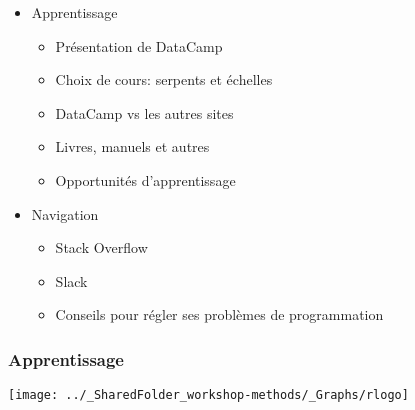\documentclass{beamer}
\begin{document}
    \begin{frame}
    
        \begin{itemize}
        
        \item{Apprentissage}
        
          \begin{itemize}
            \item Présentation de DataCamp 
            \item Choix de cours: serpents et échelles
            \item DataCamp vs les autres sites
            \item Livres, manuels et autres 
            \item Opportunités d'apprentissage
          \end{itemize}
        
         \item{Navigation}
         
          \begin{itemize}
            \item{Stack Overflow}
            \item{Slack}
            \item{Conseils pour régler ses problèmes de programmation}
          \end{itemize}
          
        \end{itemize}
        
    \end{frame}


    \begin{frame}
    
      \frametitle{Apprentissage} \vspace{1cm}
      
          \begin{center}
          
        \texttt{[image: ../\_SharedFolder\_workshop-methods/\_Graphs/rlogo]}

          \end{center}
          
    \end{frame}



\end{document}
